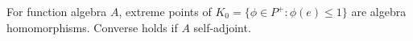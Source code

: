 For function algebra $A$, extreme points of $K_0=\{\phi\in P^+:\phi(e)\leqslant1\}$ are algebra homomorphisms. Converse holds if $A$ self-adjoint.
